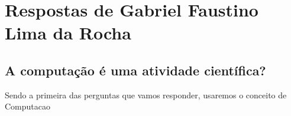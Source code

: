 \section{Respostas de Gabriel Faustino Lima da Rocha}

\subsection{A computação é uma atividade científica?}

Sendo a primeira das perguntas que vamos responder, usaremos o conceito de \gls{Computacao}